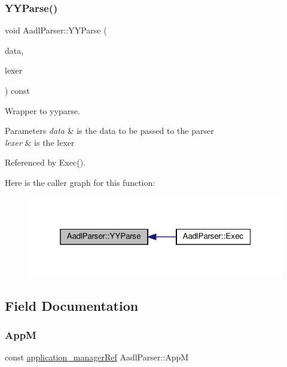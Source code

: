 \subsubsection{\texorpdfstring{Y\+Y\+Parse()}{YYParse()}}
{\footnotesize\ttfamily void Aadl\+Parser\+::\+Y\+Y\+Parse (\begin{DoxyParamCaption}\item[{const \hyperlink{aadl__parser_8hpp_a3c21c833ee79a0a6153a4d8549698b31}{Aadl\+Parser\+Data\+Ref}}]{data,  }\item[{const \hyperlink{aadl__lexer_8hpp_ac7b58912355fa52acc39b13b270fecd5}{Aadl\+Flex\+Lexer\+Ref}}]{lexer }\end{DoxyParamCaption}) const\hspace{0.3cm}{\ttfamily [protected]}}



Wrapper to yyparse. 


\begin{DoxyParams}{Parameters}
{\em data} & is the data to be passed to the parser \\
\hline
{\em lexer} & is the lexer \\
\hline
\end{DoxyParams}


Referenced by Exec().

Here is the caller graph for this function\+:
\nopagebreak
\begin{figure}[H]
\begin{center}
\leavevmode
\includegraphics[width=319pt]{db/daa/classAadlParser_acecaf8ee4223f68c15c7d8087b09e544_icgraph}
\end{center}
\end{figure}


\subsection{Field Documentation}
\mbox{\label{classAadlParser_a3caa16a2aa1b023109ad23c60ee372d6}} 
\subsubsection{\texorpdfstring{AppM}{AppM}}
{\footnotesize\ttfamily const \hyperlink{application__manager_8hpp_a04ccad4e5ee401e8934306672082c180}{application\+\_\+manager\+Ref} Aadl\+Parser\+::\+AppM\hspace{0.3cm}{\ttfamily [protected]}}



